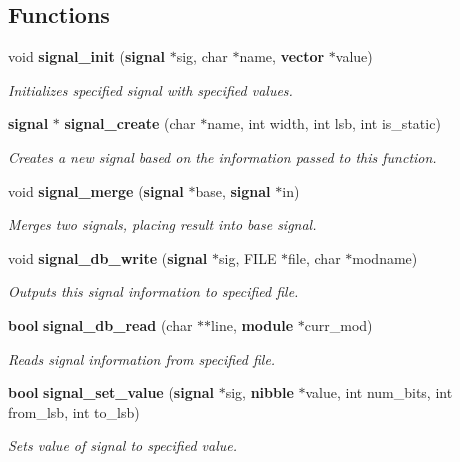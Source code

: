 \subsection*{Functions}
\begin{CompactItemize}
\item 
void {\bf signal\_\-init} ({\bf signal} $\ast$sig, char $\ast$name, {\bf vector} $\ast$value)
\begin{CompactList}\small\item\em Initializes specified signal with specified values.\item\end{CompactList}\item 
{\bf signal} $\ast$ {\bf signal\_\-create} (char $\ast$name, int width, int lsb, int is\_\-static)
\begin{CompactList}\small\item\em Creates a new signal based on the information passed to this function.\item\end{CompactList}\item 
void {\bf signal\_\-merge} ({\bf signal} $\ast$base, {\bf signal} $\ast$in)
\begin{CompactList}\small\item\em Merges two signals, placing result into base signal.\item\end{CompactList}\item 
void {\bf signal\_\-db\_\-write} ({\bf signal} $\ast$sig, FILE $\ast$file, char $\ast$modname)
\begin{CompactList}\small\item\em Outputs this signal information to specified file.\item\end{CompactList}\item 
{\bf bool} {\bf signal\_\-db\_\-read} (char $\ast$$\ast$line, {\bf module} $\ast$curr\_\-mod)
\begin{CompactList}\small\item\em Reads signal information from specified file.\item\end{CompactList}\item 
{\bf bool} {\bf signal\_\-set\_\-value} ({\bf signal} $\ast$sig, {\bf nibble} $\ast$value, int num\_\-bits, int from\_\-lsb, int to\_\-lsb)
\begin{CompactList}\small\item\em Sets value of signal to specified value.\item\end{CompactList}\item 
$$
\end{CompactItemize}
